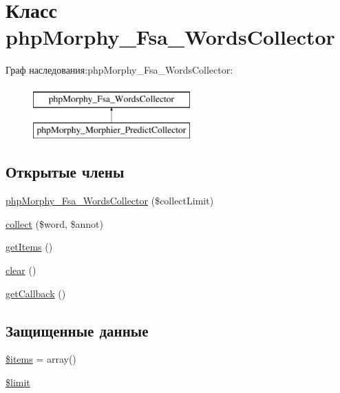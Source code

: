\hypertarget{classphpMorphy__Fsa__WordsCollector}{
\section{Класс phpMorphy\_\-Fsa\_\-WordsCollector}
\label{classphpMorphy__Fsa__WordsCollector}
}
Граф наследования:phpMorphy\_\-Fsa\_\-WordsCollector:\begin{figure}[H]
\begin{center}
\leavevmode
\includegraphics[height=2.000000cm]{classphpMorphy__Fsa__WordsCollector}
\end{center}
\end{figure}
\subsection*{Открытые члены}
\begin{DoxyCompactItemize}
\item 
\hyperlink{classphpMorphy__Fsa__WordsCollector_a02acf286394148faca4134e454dd4271}{phpMorphy\_\-Fsa\_\-WordsCollector} (\$collectLimit)
\item 
\hyperlink{classphpMorphy__Fsa__WordsCollector_a978b4bd966c467d44c448c2f0fa93b2a}{collect} (\$word, \$annot)
\item 
\hyperlink{classphpMorphy__Fsa__WordsCollector_a48e3d9f3698130ac80fdbb3a22dcf85c}{getItems} ()
\item 
\hyperlink{classphpMorphy__Fsa__WordsCollector_af8dfc6b1a19f3b21c2566c5282f51280}{clear} ()
\item 
\hyperlink{classphpMorphy__Fsa__WordsCollector_a6893c4a49d4cda582b505fcd39a1f318}{getCallback} ()
\end{DoxyCompactItemize}
\subsection*{Защищенные данные}
\begin{DoxyCompactItemize}
\item 
\hyperlink{classphpMorphy__Fsa__WordsCollector_aee90e76e758df018693ccb082d5c0949}{\$items} = array()
\item 
\hyperlink{classphpMorphy__Fsa__WordsCollector_aeb220e735cacc2afd8ad794b65163b3d}{\$limit}
\end{DoxyCompactItemize}


